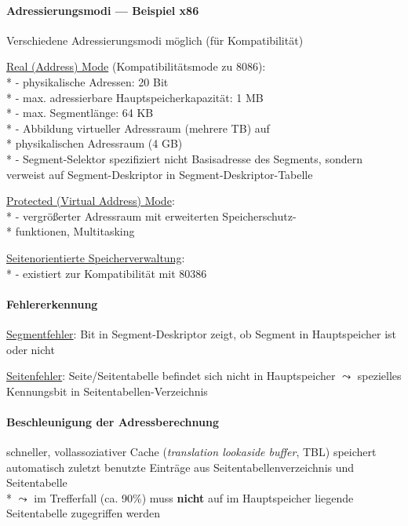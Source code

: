 \paragraph{Adressierungsmodi --- Beispiel x86}
\begin{items}
  \item Verschiedene Adressierungsmodi möglich (für Kompatibilität)
  \item \underline{Real (Address) Mode} (Kompatibilitätsmode zu 8086): \\*
    - physikalische Adressen: 20 Bit \\*
    - max. adressierbare Hauptspeicherkapazität: 1 MB \\*
    - max. Segmentlänge: 64 KB \\*
    - Abbildung virtueller Adressraum (mehrere TB) auf \\* \phantom{-} physikalischen Adressraum (4 GB) \\*
    - Segment-Selektor spezifiziert nicht Basisadresse des Segments, sondern verweist auf Segment-Deskriptor in Segment-Deskriptor-Tabelle
  \item \underline{Protected (Virtual Address) Mode}: \\*
    - vergrößerter Adressraum mit erweiterten Speicherschutz- \\* \phantom{-} funktionen, Multitasking
  \item \underline{Seitenorientierte Speicherverwaltung}: \\*
    - existiert zur Kompatibilität mit 80386
\end{items}

\paragraph{Fehlererkennung}
\begin{items}
  \item \underline{Segmentfehler}: Bit in Segment-Deskriptor zeigt, ob Segment in Hauptspeicher ist oder nicht
  \item \underline{Seitenfehler}: Seite/Seitentabelle befindet sich nicht in Hauptspeicher \( \leadsto \) spezielles Kennungsbit in Seitentabellen-Verzeichnis
\end{items}

\paragraph{Beschleunigung der Adressberechnung}
\begin{items}
  \item schneller, vollassoziativer Cache (\emph{translation lookaside buffer}, TBL) speichert automatisch zuletzt benutzte Einträge aus Seitentabellenverzeichnis und Seitentabelle \\*
  \( \leadsto \) im Trefferfall (ca. 90\%) muss \textbf{nicht} auf im Hauptspeicher liegende Seitentabelle zugegriffen werden
\end{items}

